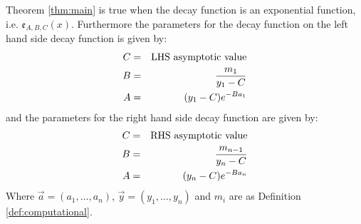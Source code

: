 \documentclass[10pt]{article}
\begin{document}
\begin{theorem}
\label{thm:exponential}
Theorem \ref{thm:main} is true when the decay function is an exponential function, i.e.
$\mathfrak{e}_{A,B,C}(x)$.  Furthermore the parameters for the decay function on the left hand
side decay function is given by:
\begin{eqnarray*}
C&=&\hbox{LHS asymptotic value} \\
B &=& \frac{m_1}{y_1-C} \\
A&=&(y_1-C)e^{-Ba_1}
\end{eqnarray*}
and the parameters for the right hand side decay function are given by:
\begin{eqnarray*}
C&=&\hbox{RHS asymptotic value}\\
B &=& \frac{m_{n-1}}{y_n-C} \\
A&=&(y_n-C)e^{-Ba_n}
\end{eqnarray*}
Where $\vec{a}=(a_1, \ldots, a_n)$, $\vec{y}=(y_1,\ldots,y_n)$ and $m_i$ are
as Definition \ref{def:computational}.
\end{theorem}
\end{document}
